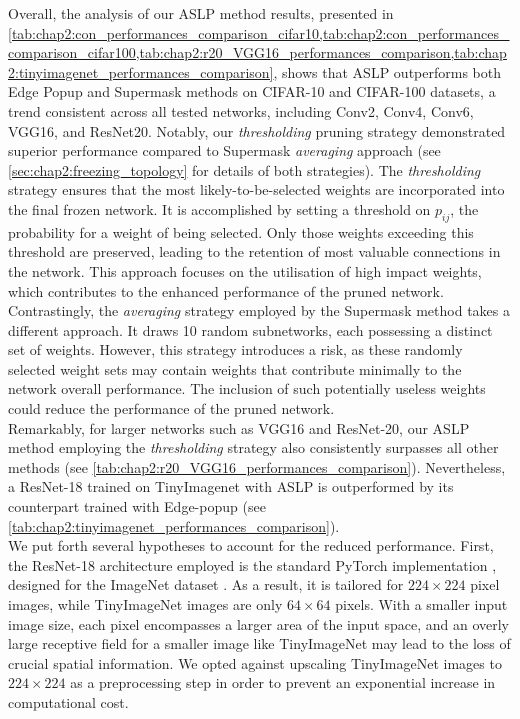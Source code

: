 Overall, the analysis of our \ac{ASLP} method results, presented in
\cref{tab:chap2:con_performances_comparison_cifar10,tab:chap2:con_performances_comparison_cifar100,tab:chap2:r20_VGG16_performances_comparison,tab:chap2:tinyimagenet_performances_comparison},
shows that \ac{ASLP} outperforms both Edge Popup and Supermask methods on
CIFAR-10 and CIFAR-100 datasets, a trend consistent across all tested networks,
including Conv2, Conv4, Conv6, VGG16, and ResNet20. Notably, our
\textit{thresholding} pruning strategy demonstrated superior performance
compared to Supermask \textit{averaging} approach (see
\cref{sec:chap2:freezing_topology} for details of both strategies). The
\textit{thresholding} strategy ensures that the most likely-to-be-selected
weights are incorporated into the final frozen network. It is accomplished by
setting a threshold on $p_{ij}$, the probability for a weight of being selected.
Only those weights exceeding this threshold are preserved, leading to the
retention of most valuable connections in the network. This approach focuses on
the utilisation of high impact weights, which contributes to the enhanced
performance of the pruned network. Contrastingly, the \textit{averaging}
strategy employed by the Supermask method \cite{DBLP:conf/nips/ZhouLLY19} takes
a different approach. It draws 10 random subnetworks, each possessing a distinct
set of weights. However, this strategy introduces a risk, as these randomly
selected weight sets may contain weights that contribute minimally to the
network overall performance. The inclusion of such potentially useless weights
could reduce the performance of the pruned network.\\

Remarkably, for larger networks such as VGG16 and ResNet-20, our \ac{ASLP}
method employing the \textit{thresholding} strategy also consistently surpasses
all other methods (see \cref{tab:chap2:r20_VGG16_performances_comparison}).
Nevertheless, a ResNet-18 trained on TinyImagenet with \ac{ASLP} is outperformed
by its counterpart trained with Edge-popup (see
\cref{tab:chap2:tinyimagenet_performances_comparison}).\\

We put forth several hypotheses to account for the reduced performance. First,
the ResNet-18 architecture employed is the standard PyTorch implementation
\cite{pytorch_resnet18}, designed for the ImageNet dataset
\cite{deng2009imagenet}. As a result, it is tailored for $224 \times 224$ pixel
images, while TinyImageNet images are only $64 \times 64$ pixels. With a smaller
input image size, each pixel encompasses a larger area of the input space, and
an overly large receptive field for a smaller image like TinyImageNet may lead
to the loss of crucial spatial information. We opted against upscaling
TinyImageNet images to $224 \times 224$ as a preprocessing step in order to
prevent an exponential increase in computational cost.\\

